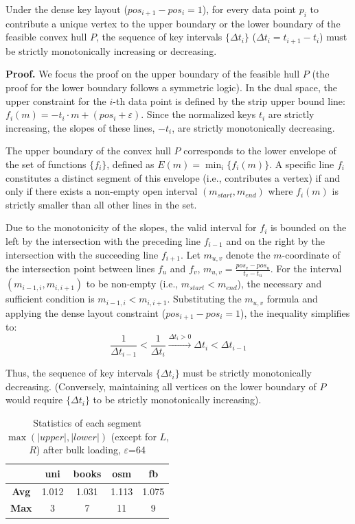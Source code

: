 \begin{lemma}
\label{lemma:oeta}
    Under the dense key layout ($pos_{i+ 1} - pos_i = 1$), for every data point $p_i$ to contribute a unique vertex to the upper boundary or the lower boundary of the feasible convex hull $P$, the sequence of key intervals $\{\Delta t_i\}$ ($\Delta t_i = t_{i+1} - t_i$) must be strictly monotonically increasing or decreasing.
\end{lemma}

\textbf{Proof.} We focus the proof on the upper boundary of the feasible hull $P$ (the proof for the lower boundary follows a symmetric logic). In the dual space, the upper constraint for the $i$-th data point is defined by the strip upper bound line: $f_i(m) = -t_i \cdot m + (pos_i + \varepsilon)$. Since the normalized keys $t_i$ are strictly increasing, the slopes of these lines, $-t_i$, are strictly monotonically decreasing.

The upper boundary of the convex hull $P$ corresponds to the lower envelope of the set of functions $\{f_i\}$, defined as $E(m) = \min_i \{f_i(m)\}$. A specific line $f_i$ constitutes a distinct segment of this envelope (i.e., contributes a vertex) if and only if there exists a non-empty open interval $(m_{start}, m_{end})$ where $f_i(m)$ is strictly smaller than all other lines in the set.

Due to the monotonicity of the slopes, the valid interval for $f_i$ is bounded on the left by the intersection with the preceding line $f_{i-1}$ and on the right by the intersection with the succeeding line $f_{i+1}$. Let $m_{u, v}$ denote the $m$-coordinate of the intersection point between lines $f_u$ and $f_v$, $m_{u, v} = \frac{pos_v - pos_u}{t_v - t_u}$. For the interval $(m_{i-1, i}, m_{i, i+1})$ to be non-empty (i.e., $m_{start} < m_{end}$), the necessary and sufficient condition is
$m_{i-1, i} < m_{i, i+1}$. Substituting the $m_{u, v}$ formula and applying the dense layout constraint ($pos_{i+1} - pos_i = 1$), the inequality simplifies to:
$$\frac{1}{\Delta t_{i-1}} < \frac{1}{\Delta t_i} \xrightarrow[]{\Delta t_i > 0} \Delta t_i < \Delta t_{i-1}$$

Thus, the sequence of key intervals $\{\Delta t_i\}$ must be strictly monotonically decreasing. (Conversely, maintaining all vertices on the lower boundary of $P$ would require $\{\Delta t_i\}$ to be strictly monotonically increasing).

\begin{table}
  \centering
  \caption{Statistics of each segment $\max(|upper|, |lower|)$ (except for $L$, $R$) after bulk loading, $\varepsilon$=64}
  \label{tab:oeta}
  \begin{tabular}{ccccc}
    \toprule
     &\textbf{uni}&\textbf{books}&\textbf{osm}&\textbf{fb}\\
    \midrule
    \textbf{Avg} & 1.012 & 1.031&1.113 & 1.075\\
    \textbf{Max} & 3 & 7 & 11 & 9\\
  \bottomrule
\end{tabular}
\end{table}

